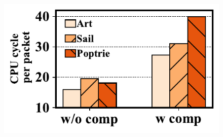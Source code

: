 \documentclass[a4paper]{article}
\begin{document}
\begin{figure}[htbp]
	\includegraphics{../result/example4.pdf}
\end{figure}
\end{document}
